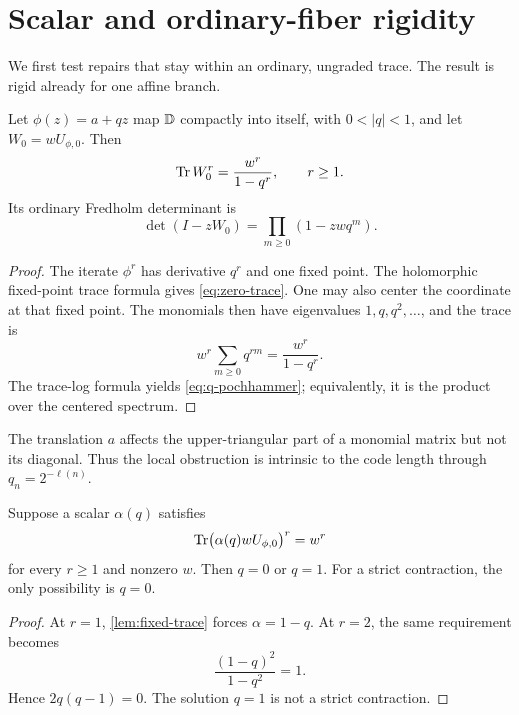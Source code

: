 \section{Scalar and ordinary-fiber rigidity}
\label{sec:rigidity}

We first test repairs that stay within an ordinary, ungraded trace.  The
result is rigid already for one affine branch.

\begin{lemma}
\label{lem:fixed-trace}
Let \(\phi(z)=a+qz\) map \(\mathbb D\) compactly into itself, with
\(0<|q|<1\), and let \(W_0=wU_{\phi,0}\).  Then
\begin{equation}
        \operatorname{Tr} W_0^r=\frac{w^r}{1-q^r},\qquad r\ge1.
 \label{eq:zero-trace}
\end{equation}
Its ordinary Fredholm determinant is
\begin{equation}
        \det(I-zW_0)=\prod_{m\ge0}(1-zwq^m).
 \label{eq:q-pochhammer}
\end{equation}
\end{lemma}

\begin{proof}
The iterate \(\phi^r\) has derivative \(q^r\) and one fixed point.  The
holomorphic fixed-point trace formula gives \eqref{eq:zero-trace}.  One may
also center the coordinate at that fixed point.  The monomials then have
eigenvalues \(1,q,q^2,\ldots\), and the trace is
\[
        w^r\sum_{m\ge0}q^{rm}=\frac{w^r}{1-q^r}.
\]
The trace-log formula yields \eqref{eq:q-pochhammer}; equivalently, it is the
product over the centered spectrum.
\end{proof}

The translation \(a\) affects the upper-triangular part of a monomial
matrix but not its diagonal.  Thus the local obstruction is intrinsic to
the code length through \(q_n=2^{-\ell(n)}\).

\begin{proposition}
\label{prop:scalar-rigidity}
Suppose a scalar \(\alpha(q)\) satisfies
\[
 \operatorname{Tr}\bigl(\alpha(q)wU_{\phi,0}\bigr)^r=w^r
\]
for every \(r\ge1\) and nonzero \(w\).  Then \(q=0\) or \(q=1\).  For a
strict contraction, the only possibility is \(q=0\).
\end{proposition}

\begin{proof}
At \(r=1\), \cref{lem:fixed-trace} forces \(\alpha=1-q\).  At \(r=2\),
the same requirement becomes
\[
        \frac{(1-q)^2}{1-q^2}=1.
\]
Hence \(2q(q-1)=0\).  The solution \(q=1\) is not a strict contraction.
\end{proof}

